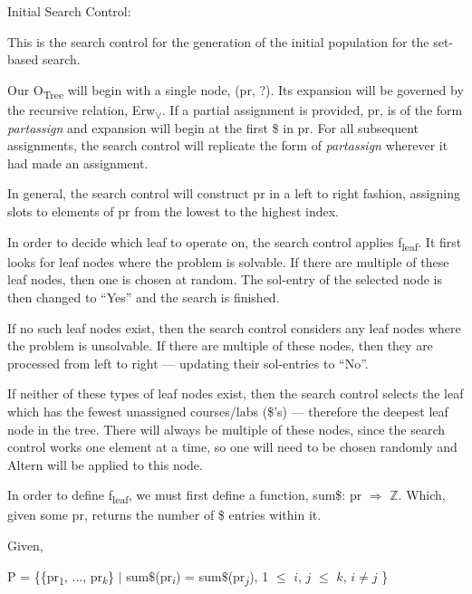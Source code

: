 \documentclass[11pt, oneside]{article}   	%
\newenvironment{cmr}{\fontfamily{cmr}\selectfont}{\par}
\begin{document}

\begin{cmr}
\noindent Initial Search Control:

\noindent This is the search control for the generation of the initial population for the set-based search.

\noindent Our O\textsubscript{Tree} will begin with a single node, (pr, ?). Its expansion will be governed by the recursive relation, Erw\textsubscript{$\lor$}.
If a partial assignment is provided, pr, is of the form \textit{partassign} and expansion will begin at the first \$ in pr. For all subsequent assignments, the search control will replicate the form of \textit{partassign} wherever it had made an assignment.

\noindent In general, the search control will construct pr in a left to right fashion, assigning slots to elements of pr from the lowest to the highest index.

\noindent In order to decide which leaf to operate on, the search control applies f\textsubscript{leaf}. It first looks for leaf nodes where the problem is solvable. If there are multiple of these leaf nodes, then one is chosen at random. The sol-entry of the selected node is then changed to ``Yes'' and the search is finished.

\noindent If no such leaf nodes exist, then the search control considers any leaf nodes where the problem is unsolvable. If there are multiple of these nodes, then they are processed from left to right --- updating their sol-entries to ``No''.

\noindent If neither of these types of leaf nodes exist, then the search control selects the leaf which has the fewest unassigned courses/labs (\$'s) --- therefore the deepest leaf node in the tree. 
There will always be multiple of these nodes, since the search control works one element at a time, so one will need to be chosen randomly and Altern will be applied to this node.

\noindent In order to define f\textsubscript{leaf}, we must first define a function, sum\$: pr $\Rightarrow$ $\mathbb{Z}$. Which, given some pr, returns the number of \$ entries within it. 

\noindent Given,\\
\centerline{P =  \{\{pr\textsubscript{1}, $\dots$, pr\textsubscript{$k$}\} $\vert$ sum$\$$(pr\textsubscript{$i$}) = sum$\$$(pr\textsubscript{$j$}), 1 $\leq$ $i$, $j$ $\leq$ $k$, $i \neq j$ \}}


\end{cmr}
\end{document}
